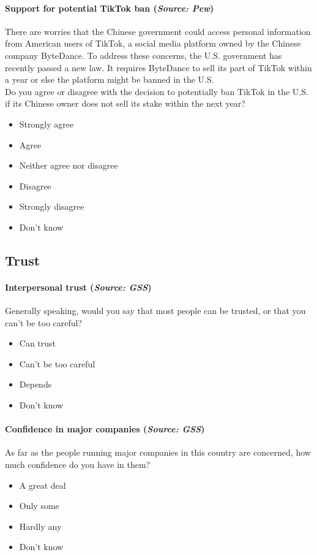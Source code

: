 \paragraph{Support for potential TikTok ban (\textit{Source: Pew})}
There are worries that the Chinese government could access personal information from American users of TikTok, a social media platform owned by the Chinese company ByteDance. To address these concerns, the U.S. government has recently passed a new law. It requires ByteDance to sell its part of TikTok within a year or else the platform might be banned in the U.S.\\
Do you agree or disagree with the decision to potentially ban TikTok in the U.S. if its Chinese owner does not sell its stake within the next year?
\begin{itemize}[itemsep=-10pt,topsep=0pt]
\item Strongly agree
\item Agree
\item Neither agree nor disagree
\item Disagree
\item Strongly disagree
\item Don’t know
\end{itemize}


\subsection{Trust}

\paragraph{Interpersonal trust (\textit{Source: GSS})}
Generally speaking, would you say that most people can be trusted, or that you can’t be too careful?
\begin{itemize}[itemsep=-10pt,topsep=0pt]
\item Can trust
\item Can’t be too careful
\item Depends
\item Don’t know
\end{itemize}

\paragraph{Confidence in major companies (\textit{Source: GSS})}
As far as the people running major companies in this country are concerned, how much confidence do you have in them?
\begin{itemize}[itemsep=-10pt,topsep=0pt]
\item A great deal
\item Only some
\item Hardly any
\item Don’t know
\end{itemize}

